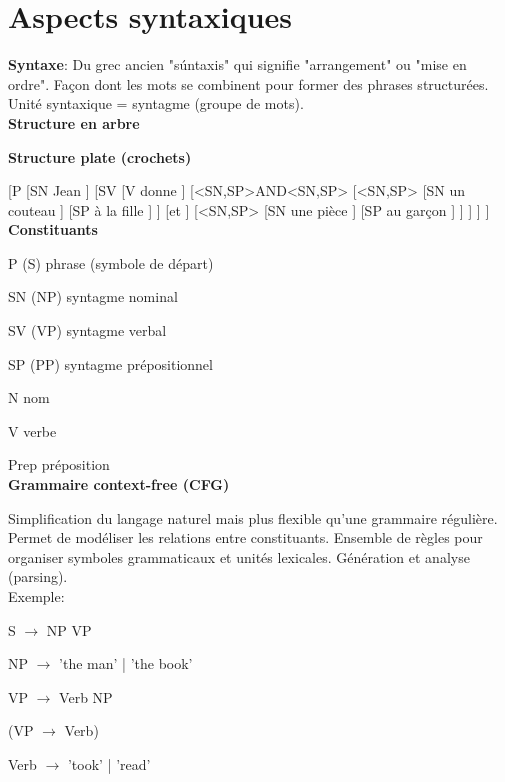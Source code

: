 \vspace{-1.2cm}

\section{Aspects syntaxiques}

\textbf{Syntaxe}: Du grec ancien "súntaxis" qui signifie "arrangement" ou "mise en ordre". Façon dont les mots se combinent pour former des phrases structurées. Unité syntaxique = syntagme (groupe de mots).\\

\textbf{Structure en arbre}

\begin{center}
\resizebox{0.6\textwidth}{!}{
    
}
\end{center}

\textbf{Structure plate (crochets)}

[P [SN Jean ] [SV [V donne ] [<SN,SP>AND<SN,SP> [<SN,SP> [SN un couteau ] [SP à la fille ] ] [et ] [<SN,SP> [SN une pièce ] [SP au garçon ] ] ] ] ] \\

\textbf{Constituants}

P (S) phrase (symbole de départ)

SN (NP) syntagme nominal

SV (VP) syntagme verbal

SP (PP) syntagme prépositionnel

N nom

V verbe

Prep préposition\\

\textbf{Grammaire context-free (CFG)}

Simplification du langage naturel mais plus flexible qu'une grammaire régulière. Permet de modéliser les relations entre constituants. Ensemble de règles pour organiser symboles grammaticaux et unités lexicales. Génération et analyse (parsing).\\

Exemple:

S $\rightarrow$ NP VP

NP $\rightarrow$ 'the man' | 'the book'

VP $\rightarrow$ Verb NP

(VP $\rightarrow$ Verb)

Verb $\rightarrow$ 'took' | 'read' \\


